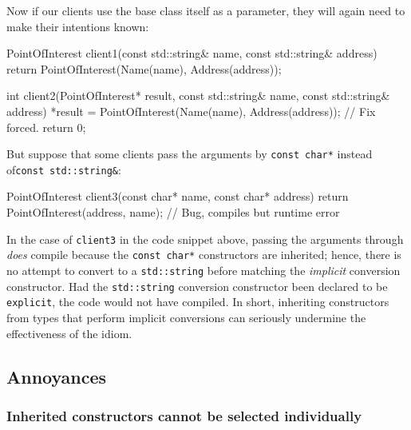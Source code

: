 \noindent Now if our clients use the base class itself as a parameter, they will
again need to make their intentions known:

\begin{emcppslisting}[emcppsbatch=e11]
PointOfInterest client1(const std::string& name, const std::string& address)    
{                                                                               
    return PointOfInterest(Name(name), Address(address));
} 

int client2(PointOfInterest*   result,                                          
            const std::string& name,                                            
            const std::string& address)                                         
{
   *result = PointOfInterest(Name(name), Address(address)); // Fix forced.     
    return 0;                                                                   
}
\end{emcppslisting}
    
\noindent But suppose that some clients pass the arguments by
\lstinline!const!~\lstinline!char*! instead of\linebreak[4]
\mbox{\lstinline!const!~\lstinline!std::string&!}:

\begin{emcppslisting}[emcppsbatch=e11]
PointOfInterest client3(const char* name, const char* address)
{
    return PointOfInterest(address, name);  // Bug, compiles but runtime error
}
\end{emcppslisting}
    
\noindent In the case of \lstinline!client3! in the code snippet above, passing the arguments through
\emph{does} compile because the \lstinline!const!~\lstinline!char*!
constructors are inherited; hence, there is no attempt to convert
to a \lstinline!std::string! before matching the \emph{implicit} conversion
constructor. Had the \lstinline!std::string! conversion
constructor been declared to be \lstinline!explicit!, the code would not
have compiled. In short, inheriting constructors from types that perform implicit
conversions can seriously undermine the effectiveness of the  idiom.

\subsection[Annoyances]{Annoyances}\label{annoyances-inheritingctor}

\subsubsection[Inherited constructors cannot be selected individually]{Inherited constructors cannot be selected individually}\label{inherited-constructors-cannot-be-selected-individually}

